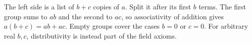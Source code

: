 The left side is a list of $b+c$ copies of $a$. Split it after its first $b$ terms. The first group sums to $ab$ and the second to $ac$, so associativity of addition gives $a(b+c)=ab+ac$. Empty groups cover the cases $b=0$ or $c=0$. For arbitrary real $b,c$, distributivity is instead part of the field axioms.
